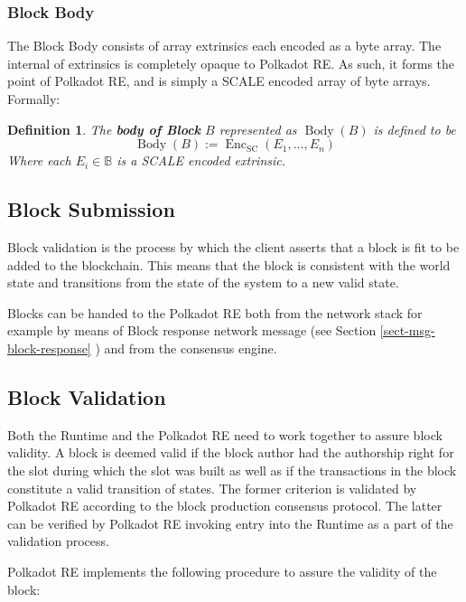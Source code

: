\documentclass{book}
\newcommand{\assign}{:=}
\newcommand{\tmop}[1]{\ensuremath{\operatorname{#1}}}
\newcommand{\tmstrong}[1]{\textbf{#1}}
\newcommand{\tmverbatim}[1]{{\ttfamily{#1}}}
\newtheorem{definition}{Definition}
\newtheorem{definition}{Definition}
\begin{document}
\subsubsection{Block Body}\label{sect-block-body}

The Block Body consists of array extrinsics each encoded as a byte array. The
internal of extrinsics is completely opaque to Polkadot RE. As such, it forms
the point of Polkadot RE, and is simply a SCALE encoded array of byte arrays.
Formally:

\begin{definition}
  \label{defn-block-body}The {\tmstrong{body of Block}} $B$ represented as
  {\tmstrong{$\tmop{Body} (B)$}} is defined to be
  \[ \tmop{Body} (B) \assign \tmop{Enc}_{\tmop{SC}} (E_1, \ldots, E_n) \]
  Where each $E_i \in \mathbb{B}$ is a SCALE encoded extrinsic.
\end{definition}

\subsection{Block Submission}\label{sect-block-submission}

Block validation is the process by which the client asserts that a block is
fit to be added to the blockchain. This means that the block is consistent
with the world state and transitions from the state of the system to a new
valid state.

Blocks can be handed to the Polkadot RE both from the network stack for
example by means of Block response network message (see Section
\ref{sect-msg-block-response} ) and from the consensus engine.

\subsection{Block Validation}\label{sect-block-validation}

Both the Runtime and the Polkadot RE need to work together to assure block
validity. A block is deemed valid if the block author had the authorship right
for the slot during which the slot was built as well as if the transactions in
the block constitute a valid transition of states. The former criterion is
validated by Polkadot RE according to the block production consensus protocol.
The latter can be verified by Polkadot RE invoking \tmverbatim{execute\_block}
entry into the Runtime as a part of the validation process.

Polkadot RE implements the following procedure to assure the validity of the
block:
\end{document}
